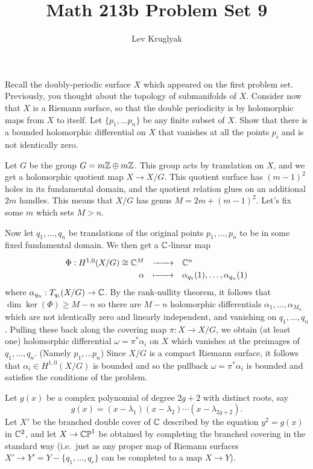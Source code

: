 \documentclass[expanded]{lkx_pset}
\title{Math 213b Problem Set 9}
\author{Lev Kruglyak}
\begin{document}
\maketitle

\begin{problem}{1}
Recall the doubly-periodic surface $X$ which appeared on the first problem set. Previously, you thought about the topology of submanifolds of $X$. Consider now that $X$ is a Riemann surface, so that the double periodicity is by holomorphic maps from $X$ to itself. Let $\{p_{1}, \dots p_{n}\}$ be any finite subset of $X$. Show that there is a bounded holomorphic differential on $X$ that vanishes at all the points $p_{i}$ and is not identically zero.
\end{problem}

\begin{solution}
	Let $G$ be the group $G = m\mathbb{Z}\oplus m\mathbb{Z}$. This group acts by translation on $X$, and we get a holomorphic quotient map $X \to X/G$. This quotient surface has $(m-1)^2$ holes in its fundamental domain, and the quotient relation glues on an additional $2m$ handles. This means that $X/G$ has genus $M=2m+(m-1)^2$. Let's fix some $m$ which sets $M>n$.

	Now let $q_1,\ldots,q_n$ be translations of the original points $p_1,\ldots, p_n$ to be in some fixed fundamental domain. We then get a $\mathbb{C}$-linear map
	\[
		\definefunction{\Phi}{H^{1,0}(X/G)\cong\C^M}{\C^n}{\alpha}{\alpha_{q_1}(1),\ldots, \alpha_{q_n}(1)}
	\]
	where $\alpha_{q_n} : T_{q_i}(X/G) \to \mathbb{C}$. By the rank-nullity theorem, it follows that $\dim\ker(\Phi)\geq M-n$ so there are $M-n$ holomorphic differentials $\alpha_1,\ldots, \alpha_{M_n}$ which are not identically zero and linearly independent, and vanishing on $q_1,\ldots, q_n$. Pulling these back along the covering map $\pi : X \to X/G$, we obtain (at least one) holomorphic differential $\omega = \pi^*\alpha_i$ on $X$ which vanishes at the preimages of $q_1,\ldots, q_n$. (Namely $p_1,\ldots p_n$) Since $X/G$ is a compact Riemann surface, it follows that $\alpha_i\in H^{1,0}(X/G)$ is bounded and so the pullback $\omega = \pi^*\alpha_i$ is bounded and satisfies the conditions of the problem.
\end{solution}

\begin{problem}{2}
Let $g(x)$ be a complex polynomial of degree $2g+2$ with distinct roots, say
\[
	g(x) = (x - \lambda_{1})(x - \lambda_{2}) \cdots (x-\lambda_{2g+2}).
\]
Let $X'$ be the branched double cover of $\mathbb{C}$ described by the equation $y^{2}=g(x)$ in $\mathbb{C}^{2}$, and let $X \to \mathbb{CP}^{1}$ be obtained by completing the branched covering in the standard way (i.e.\ just as any proper map of Riemann surfaces $X'\to Y'=Y-\{q_{1},\dots, q_{r}\}$ can be completed to a map $X\to Y$).\medskip
\end{problem}
\end{document}
